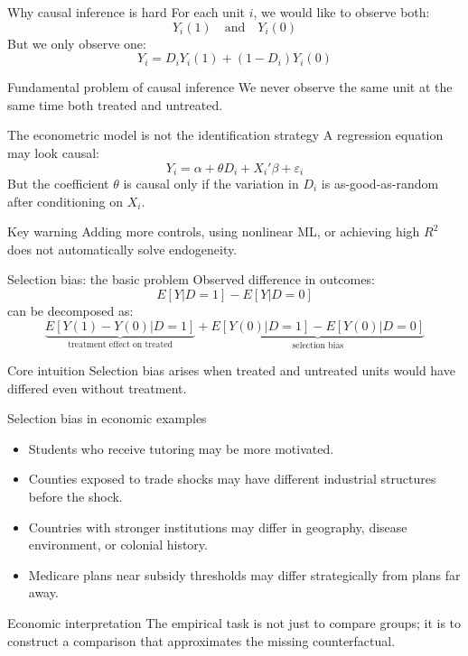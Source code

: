 \documentclass[aspectratio=169,11pt]{beamer}
\newcommand{\core}[1]{\begin{block}{Core intuition}#1\end{block}}
\newcommand{\econ}[1]{\begin{exampleblock}{Economic interpretation}#1\end{exampleblock}}
\begin{document}
\begin{frame}{Why causal inference is hard}
For each unit $i$, we would like to observe both:
\[
Y_i(1) \quad \text{and} \quad Y_i(0)
\]
But we only observe one:
\[
Y_i = D_iY_i(1) + (1-D_i)Y_i(0)
\]
\begin{block}{Fundamental problem of causal inference}
We never observe the same unit at the same time both treated and untreated.
\end{block}
\end{frame}

\begin{frame}{The econometric model is not the identification strategy}
A regression equation may look causal:
\[
Y_i = \alpha + \theta D_i + X_i'\beta + \varepsilon_i
\]
But the coefficient $\theta$ is causal only if the variation in $D_i$ is as-good-as-random after conditioning on $X_i$.
\begin{alertblock}{Key warning}
Adding more controls, using nonlinear ML, or achieving high $R^2$ does not automatically solve endogeneity.
\end{alertblock}
\end{frame}

\begin{frame}{Selection bias: the basic problem}
Observed difference in outcomes:
\[
E[Y|D=1]-E[Y|D=0]
\]
can be decomposed as:
\[
\underbrace{E[Y(1)-Y(0)|D=1]}_{\text{treatment effect on treated}}
+
\underbrace{E[Y(0)|D=1]-E[Y(0)|D=0]}_{\text{selection bias}}
\]
\core{
Selection bias arises when treated and untreated units would have differed even without treatment.
}
\end{frame}

\begin{frame}{Selection bias in economic examples}
\begin{itemize}
  \item Students who receive tutoring may be more motivated.
  \item Counties exposed to trade shocks may have different industrial structures before the shock.
  \item Countries with stronger institutions may differ in geography, disease environment, or colonial history.
  \item Medicare plans near subsidy thresholds may differ strategically from plans far away.
\end{itemize}
\econ{
The empirical task is not just to compare groups; it is to construct a comparison that approximates the missing counterfactual.
}
\end{frame}
\end{document}
